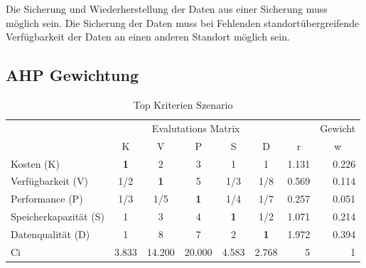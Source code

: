 Die Sicherung und Wiederherstellung der Daten aus einer Sicherung muss möglich sein. Die Sicherung der Daten muss bei Fehlenden standortübergreifende Verfügbarkeit der Daten an einen anderen Standort möglich sein.



\subsection{AHP Gewichtung}
\begin{table}[htbp]
\caption{Top Kriterien Szenario}
\begin{tabular}{|l|c|c|c|c|c|r|r|}
\hline
\multicolumn{ 1}{|c|}{} & \multicolumn{ 5}{c|}{Evalutations Matrix} & \multicolumn{1}{l|}{} & \multicolumn{1}{l|}{Gewicht} \\ \cline{ 2- 8}
\multicolumn{ 1}{|c|}{} & K & V & P & S & D & \multicolumn{1}{c|}{r} & \multicolumn{1}{c|}{w} \\ \hline
Kosten (K) & \textbf{1} & 2 & 3 & 1 & 1 & 1.131 & 0.226 \\ \hline
Verfügbarkeit (V) &  1/2 & \textbf{1} & 5 &  1/3 &  1/8 & 0.569 & 0.114 \\ \hline
Performance (P) &  1/3 &  1/5 & \textbf{1} &  1/4 &  1/7 & 0.257 & 0.051 \\ \hline
Speicherkapazität (S) & 1 & 3 & 4 & \textbf{1} &  1/2 & 1.071 & 0.214 \\ \hline
Datenqualität (D) & 1 & 8 & 7 & 2 & \textbf{1} & 1.972 & 0.394 \\ \hline  \hline
Ci & \multicolumn{1}{r|}{3.833} & \multicolumn{1}{r|}{14.200} & \multicolumn{1}{r|}{20.000} & \multicolumn{1}{r|}{4.583} & \multicolumn{1}{r|}{2.768} & 5 & 1 \\ \hline 
\end{tabular}
\label{AHPTopKriterienS}
\end{table}


